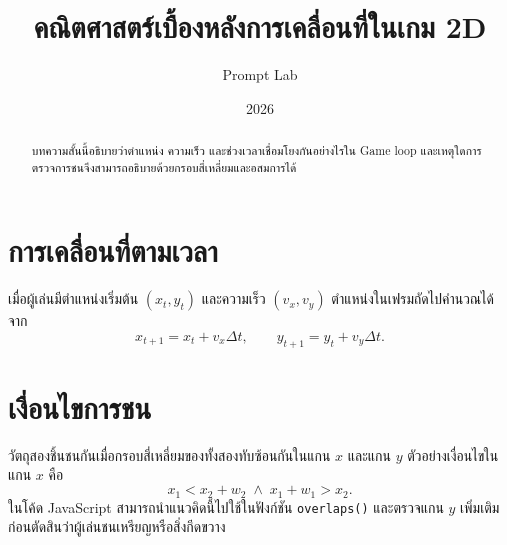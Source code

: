 \documentclass[12pt]{article}
\title{คณิตศาสตร์เบื้องหลังการเคลื่อนที่ในเกม 2D}
\author{Prompt Lab}
\date{2026}
\begin{document}
\maketitle
\begin{abstract}
บทความสั้นนี้อธิบายว่าตำแหน่ง ความเร็ว และช่วงเวลาเชื่อมโยงกันอย่างไรใน Game loop และเหตุใดการตรวจการชนจึงสามารถอธิบายด้วยกรอบสี่เหลี่ยมและอสมการได้
\end{abstract}
\section{การเคลื่อนที่ตามเวลา}
เมื่อผู้เล่นมีตำแหน่งเริ่มต้น $(x_t,y_t)$ และความเร็ว $(v_x,v_y)$ ตำแหน่งในเฟรมถัดไปคำนวณได้จาก
\[
x_{t+1}=x_t+v_x\Delta t,\qquad y_{t+1}=y_t+v_y\Delta t.
\]
\section{เงื่อนไขการชน}
วัตถุสองชิ้นชนกันเมื่อกรอบสี่เหลี่ยมของทั้งสองทับซ้อนกันในแกน $x$ และแกน $y$ ตัวอย่างเงื่อนไขในแกน $x$ คือ
\[
x_1<x_2+w_2\;\land\;x_1+w_1>x_2.
\]
ในโค้ด JavaScript สามารถนำแนวคิดนี้ไปใช้ในฟังก์ชัน \texttt{overlaps()} และตรวจแกน $y$ เพิ่มเติมก่อนตัดสินว่าผู้เล่นชนเหรียญหรือสิ่งกีดขวาง
\end{document}
